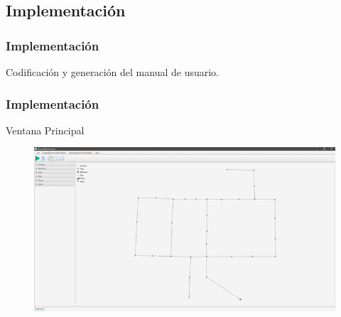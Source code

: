 \documentclass[9pt]{beamer}
\begin{document}
    \subsection{Implementación}

    \begin{frame}
        \frametitle{Implementación}                       
        Codificación y generación del manual de usuario.

    \end{frame}

    \begin{frame}
        \frametitle{Implementación}
        Ventana Principal                   
        \begin{figure}
            \includegraphics[width=\textwidth]{assets/Interfaces/Principal.png}
        \end{figure}
    \end{frame}
    
\end{document}
